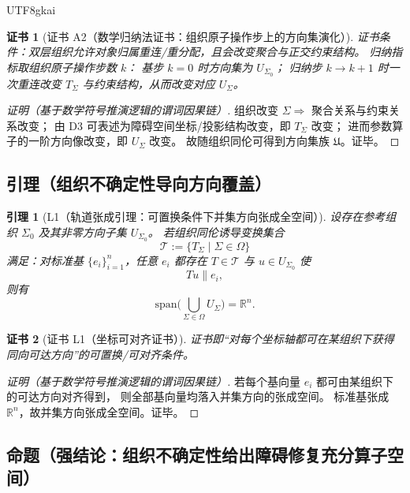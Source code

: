 \documentclass[12pt]{article}
\newtheorem{lemma}{引理}[section]
\newtheorem{Certificate}{证书}[section]
\newcommand{\RR}{\mathbb{R}}
\begin{document}
\begin{CJK*}{UTF8}{gkai}
\begin{Certificate}[证书 A2（数学归纳法证书：组织原子操作步上的方向集演化）]
\label{cert:tex28-ch9-a2}
证书条件：双层组织允许对象归属重连/重分配，且会改变聚合与正交约束结构。
归纳指标取组织原子操作步数 $k$：
基步 $k=0$ 时方向集为 $U_{\Sigma_0}$；
归纳步 $k\to k+1$ 时一次重连改变 $T_{\Sigma}$ 与约束结构，从而改变对应 $U_{\Sigma}$。
\end{Certificate}

\begin{proof}[证明（基于数学符号推演逻辑的谓词因果链）]
组织改变 $\Sigma\Rightarrow$ 聚合关系与约束关系改变；
由 D3 可表述为障碍空间坐标/投影结构改变，即 $T_{\Sigma}$ 改变；
进而参数算子的一阶方向像改变，即 $U_{\Sigma}$ 改变。
故随组织同伦可得到方向集族 $\mathfrak{U}$。证毕。
\end{proof}

\subsection{引理（组织不确定性导向方向覆盖）}
\label{subsec:tex28-ch9-lemmas}

\begin{lemma}[L1（轨道张成引理：可置换条件下并集方向张成全空间）]
\label{lem:tex28-ch9-l1}
设存在参考组织 $\Sigma_0$ 及其非零方向子集 $U_{\Sigma_0}$。
若组织同伦诱导变换集合
\[
  \mathcal{T}:=\{T_{\Sigma}\mid \Sigma\in\Omega\}
\]
满足：对标准基 $\{e_i\}_{i=1}^{n}$，任意 $e_i$ 都存在 $T\in\mathcal{T}$ 与 $u\in U_{\Sigma_0}$ 使
\[
  Tu\parallel e_i,
\]
则有
\[
  \mathrm{span}\!\Big(\bigcup_{\Sigma\in\Omega}U_{\Sigma}\Big)=\RR^n.
\]
\end{lemma}

\begin{Certificate}[证书 L1（坐标可对齐证书）]
\label{cert:tex28-ch9-l1}
证书即“对每个坐标轴都可在某组织下获得同向可达方向”的可置换/可对齐条件。
\end{Certificate}

\begin{proof}[证明（基于数学符号推演逻辑的谓词因果链）]
若每个基向量 $e_i$ 都可由某组织下的可达方向对齐得到，
则全部基向量均落入并集方向的张成空间。
标准基张成 $\RR^n$，故并集方向张成全空间。证毕。
\end{proof}

\subsection{命题（强结论：组织不确定性给出障碍修复充分算子空间）}
\label{subsec:tex28-ch9-props}


\end{CJK*}
\end{document}
